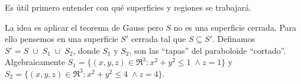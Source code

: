 \newpage
\begin{solution}
    Es \'util primero entender con qu\'e superficies y regiones se trabajar\'a.
    
    \begin{center}
    \end{center}
            
   La idea es aplicar el teorema de Gauss pero  $S$ no es una superficie cerrada.   Para ello pensemos en una superficie $S'$  cerrada tal  que $S \subseteq S'.$  Definamos   $S'=S\;\cup\;S_1\;\cup\;S_2$,  donde $S_1$ y $S_2$, son las ``tapas'' del paraboloide ``cortado''.  Algebraicamente $S_1=\{(x,y,z)\in \Re^3 : x^2+y^2\le 1\;\land z=1\}$ y $S_2=\{(x,y,z)\in \Re^3 : x^2+y^2\le4\;\land z=4\}$.
    

\end{solution}
